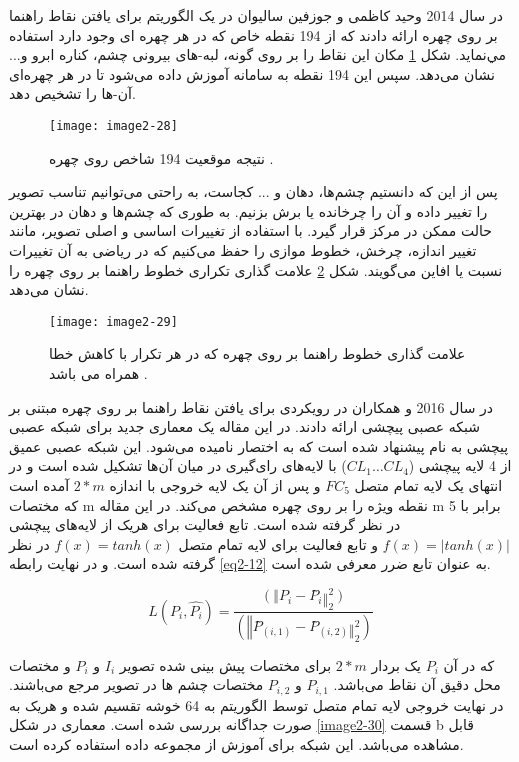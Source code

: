 \noindent 
در سال 2014 وحيد كاظمى و جوزفين ساليوان در \cite{6909637} یک الگوریتم برای یافتن نقاط راهنما  بر روی چهره ارائه دادند كه از 194 نقطه خاص كه در هر چهره اى وجود دارد استفاده مي‌نماید. شکل \ref{image2-28} مکان این نقاط را بر روی گونه، لبه-هاى بیرونی چشم، كناره ابرو و... نشان می‌دهد. سپس اين 194 نقطه به سامانه آموزش داده می‌شود تا در هر چهره‌اى آن-ها را تشخيص دهد. 
\begin{figure}[h]
\centering
  \texttt{[image: image2-28]}
  \caption{نتیجه موقعیت 194 شاخص روی چهره \cite{6909637}.}
  \label{image2-28}
\end{figure}

\noindent
پس از این که دانستیم چشم‌ها، دهان و ... کجاست، به راحتی می‌توانیم تناسب تصویر را تغییر داده و آن را چرخانده یا برش بزنیم. به طوری که چشم‌ها و دهان در بهترین حالت ممکن در مرکز قرار گیرد. با استفاده از تغییرات اساسی و اصلی تصویر، مانند تغییر اندازه، چرخش، خطوط موازی را حفظ می‌کنیم که در ریاضی به آن تغییرات نسبت یا افاین می‌گویند. شکل \ref{image2-29} علامت گذاری تکراری خطوط راهنما بر روی چهره را نشان می‌دهد. 
\begin{figure}[h]
\centering
  \texttt{[image: image2-29]}
  \caption{علامت گذاری خطوط راهنما بر روی چهره که در هر تکرار با کاهش خطا همراه می باشد \cite{6909637}.}
  \label{image2-29}
\end{figure}

\noindent
در سال 2016  و همکاران در \cite{wu2016facial} رویکردی برای یافتن نقاط راهنما بر روی چهره مبتنی بر شبکه عصبی پیچشی ارائه دادند. در این مقاله یک معماری جدید برای شبکه عصبی پیچشی به نام  پیشنهاد شده است که به اختصار  نامیده می‌شود. این شبکه عصبی عمیق از 4 لایه پیچشی ($CL_1 \dots CL_4$) با لایه‌های رای‌گیری در میان آن‌ها تشکیل شده است و در انتهای یک لایه تمام متصل  $FC_5$ و پس از آن یک لایه خروجی با اندازه $2*m$ آمده است که مختصات m نقطه ویژه را بر روی چهره مشخص می‌کند. در این مقاله m برابر با 5 در نظر گرفته شده است. تابع فعالیت برای هریک از لایه‌های پیچشی $f(x)=|tanh⁡(x)|$ و تابع فعالیت برای لایه تمام متصل $f(x)=tanh⁡(x)$ در نظر گرفته شده است. و در نهایت رابطه \ref{eq2-12} به عنوان تابع ضرر معرفی شده است.

\begin{equation}\label{eq2-12}
L(P_i,\hat{P_i})=\frac{(‖P_i-P ̂_i ‖_2^2)}{(‖P ̂_(i,1)-P ̂_(i,2) ‖_2^2 )}	
\end{equation}

\noindent
که در آن $P_i$ یک بردار $2*m$ برای مختصات پیش بینی شده تصویر $I_i$ و $P_i$ و مختصات محل دقیق آن نقاط می‌باشد. $P_{i,1}$ و $P_{i,2}$ مختصات چشم ها در تصویر مرجع می‌باشند. در نهایت خروجی لایه تمام متصل توسط الگوریتم  به 64 خوشه تقسیم شده و هریک به صورت جداگانه بررسی شده است. معماری  در شکل \ref{image2-30} قسمت b قابل مشاهده می‌باشد. این شبکه برای آموزش از مجموعه داده  استفاده کرده است.

